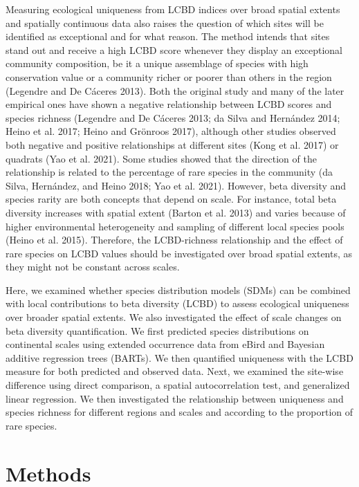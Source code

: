 \documentclass[10pt,oneside]{article}
\begin{document}
Measuring ecological uniqueness from LCBD indices over broad spatial
extents and spatially continuous data also raises the question of which
sites will be identified as exceptional and for what reason. The method
intends that sites stand out and receive a high LCBD score whenever they
display an exceptional community composition, be it a unique assemblage
of species with high conservation value or a community richer or poorer
than others in the region (Legendre and De Cáceres 2013). Both the
original study and many of the later empirical ones have shown a
negative relationship between LCBD scores and species richness (Legendre
and De Cáceres 2013; da Silva and Hernández 2014; Heino et al. 2017;
Heino and Grönroos 2017), although other studies observed both negative
and positive relationships at different sites (Kong et al. 2017) or
quadrats (Yao et al. 2021). Some studies showed that the direction of
the relationship is related to the percentage of rare species in the
community (da Silva, Hernández, and Heino 2018; Yao et al. 2021).
However, beta diversity and species rarity are both concepts that depend
on scale. For instance, total beta diversity increases with spatial
extent (Barton et al. 2013) and varies because of higher environmental
heterogeneity and sampling of different local species pools (Heino et
al. 2015). Therefore, the LCBD-richness relationship and the effect of
rare species on LCBD values should be investigated over broad spatial
extents, as they might not be constant across scales.

Here, we examined whether species distribution models (SDMs) can be
combined with local contributions to beta diversity (LCBD) to assess
ecological uniqueness over broader spatial extents. We also investigated
the effect of scale changes on beta diversity quantification. We first
predicted species distributions on continental scales using extended
occurrence data from eBird and Bayesian additive regression trees
(BARTs). We then quantified uniqueness with the LCBD measure for both
predicted and observed data. Next, we examined the site-wise difference
using direct comparison, a spatial autocorrelation test, and generalized
linear regression. We then investigated the relationship between
uniqueness and species richness for different regions and scales and
according to the proportion of rare species.

\hypertarget{methods}{%
\section{Methods}\label{methods}}
\end{document}
